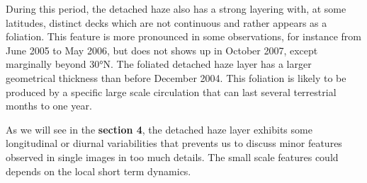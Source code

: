 During this period, the detached haze also has a strong layering with, at some latitudes, distinct decks which are not
continuous and rather appears as a foliation. This feature is more pronounced in some observations, for instance from
June 2005 to May 2006, but does not shows up in October 2007, except marginally beyond \ang{30}N. The foliated detached
haze layer has a larger geometrical thickness than before December 2004. This foliation is likely to be produced by a
specific large scale circulation that can last several terrestrial months to one year.


As we will see in the \textbf{section 4}, the detached haze layer exhibits some longitudinal or diurnal variabilities
that prevents us to discuss minor features observed in single images in too much details. The small scale features
could depends on the local short term dynamics.
